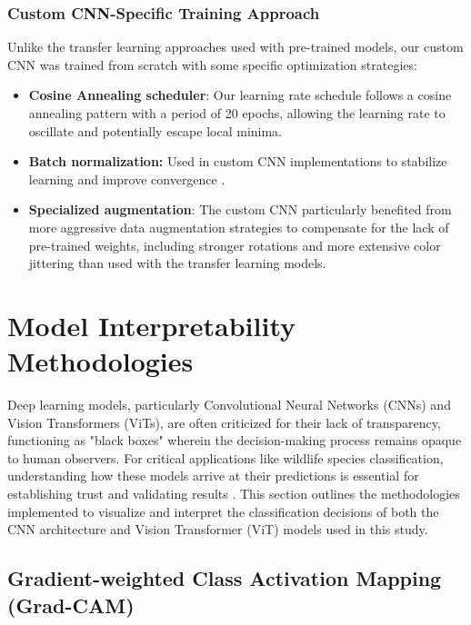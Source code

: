 \documentclass[a4paper,12pt]{report}
\begin{document}
\subsubsection{Custom CNN-Specific Training Approach}

Unlike the transfer learning approaches used with pre-trained models, our custom CNN was trained from scratch with some specific optimization strategies:

\begin{itemize}
    \item \textbf{Cosine Annealing scheduler}: Our learning rate schedule follows a cosine annealing pattern with a period of 20 epochs, allowing the learning rate to oscillate and potentially escape local minima.
    
    \item \textbf{Batch normalization:} Used in custom CNN implementations to stabilize learning and improve convergence \citep{ioffe2015batch}.
    
    \item \textbf{Specialized augmentation}: The custom CNN particularly benefited from more aggressive data augmentation strategies to compensate for the lack of pre-trained weights, including stronger rotations and more extensive color jittering than used with the transfer learning models.
\end{itemize}

\section{Model Interpretability Methodologies}

Deep learning models, particularly Convolutional Neural Networks (CNNs) and Vision Transformers (ViTs), are often criticized for their lack of transparency, functioning as "black boxes" wherein the decision-making process remains opaque to human observers. For critical applications like wildlife species classification, understanding how these models arrive at their predictions is essential for establishing trust and validating results \citep{Selvaraju_2019}. This section outlines the methodologies implemented to visualize and interpret the classification decisions of both the CNN architecture and Vision Transformer (ViT) models used in this study.

\subsection{Gradient-weighted Class Activation Mapping (Grad-CAM)}
\end{document}
